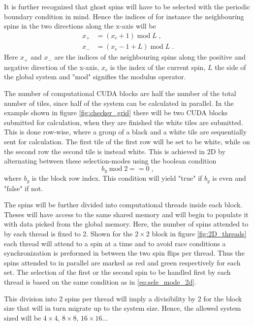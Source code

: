 \documentclass[paper=a4, fontsize=11pt]{scrartcl} %
\numberwithin{equation}{section} %
\numberwithin{figure}{section} %
\numberwithin{table}{section} %
\begin{document}
It is further recognized that ghost spins will have to be selected with the periodic boundary condition in mind. Hence the indices of for instance the neighbouring spins in the two directions along the x-axis will be
\begin{align*}
x_+&=(x_c+1)\; \text{mod} \; L \;, \\
x_-&=(x_c-1+L) \; \text{mod} \; L \;.
\end{align*}
Here $x_+$ and $x_-$ are the indices of the neighbouring spins along the positive and negative direction of the x-axis, $x_c$ is the index of the current spin, $L$ the side of the global system and "mod" signifies the modulus operator.

The number of computational CUDA blocks are half the number of the total number of tiles, since half of the system can be calculated in parallel. In the example shown in figure \ref{fig:checker_grid} there will be two CUDA blocks submitted for calculation, when they are finished the white tiles are submitted. This is done row-wise, where a group of a black and a white tile are sequentially sent for calculation. The first tile of the first row will be set to be white, while on the second row the second tile is instead white. This is achieved in 2D by alternating between these selection-modes using the boolean condition 
\begin{equation}
b_y\; \text{mod} \; 2 == 0 \;,
\label{eq:sele_mode_2d}
\end{equation}
where $b_y$ is the block row index. This condition will yield "true" if $b_y$ is even and "false" if not.

The spins will be further divided into computational threads inside each block. Theses will have access to the same shared memory and will begin to populate it with data picked from the global memory. Here, the number of spins attended to by each thread is fixed to 2. Shown for the $2\times2$ block in figure \ref{fig:2D_threads} each thread will attend to a spin at a time and to avoid race conditions a synchronization is preformed in between the two spin flips per thread. Thus the spins attended to in parallel are marked as red and green respectively for each set. The selection of the first or the second spin to be handled first by each thread is based on the same condition as in \ref{eq:sele_mode_2d}.
 
This division into 2 spins per thread will imply a divisibility by 2 for the block size that will in turn migrate up to the system size. Hence, the allowed system sized will be $4\times4$, $8\times8$, $16\times16$...
\end{document}
